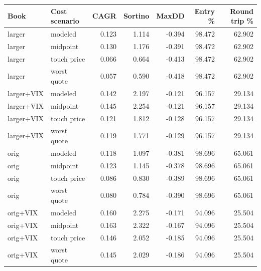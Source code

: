 \begin{tabular}{llrrrrr}
\toprule
Book & Cost scenario & CAGR & Sortino & MaxDD & Entry \% & Round trip \% \\
\midrule
larger & modeled & 0.123 & 1.114 & -0.394 & 98.472 & 62.902 \\
larger & midpoint & 0.130 & 1.176 & -0.391 & 98.472 & 62.902 \\
larger & touch price & 0.066 & 0.664 & -0.413 & 98.472 & 62.902 \\
larger & worst quote & 0.057 & 0.590 & -0.418 & 98.472 & 62.902 \\
\addlinespace
larger+VIX & modeled & 0.142 & 2.197 & -0.121 & 96.157 & 29.134 \\
larger+VIX & midpoint & 0.145 & 2.254 & -0.121 & 96.157 & 29.134 \\
larger+VIX & touch price & 0.121 & 1.812 & -0.128 & 96.157 & 29.134 \\
larger+VIX & worst quote & 0.119 & 1.771 & -0.129 & 96.157 & 29.134 \\
\addlinespace
orig & modeled & 0.118 & 1.097 & -0.381 & 98.696 & 65.061 \\
orig & midpoint & 0.123 & 1.145 & -0.378 & 98.696 & 65.061 \\
orig & touch price & 0.086 & 0.830 & -0.389 & 98.696 & 65.061 \\
orig & worst quote & 0.080 & 0.784 & -0.390 & 98.696 & 65.061 \\
\addlinespace
orig+VIX & modeled & 0.160 & 2.275 & -0.171 & 94.096 & 25.504 \\
orig+VIX & midpoint & 0.163 & 2.322 & -0.167 & 94.096 & 25.504 \\
orig+VIX & touch price & 0.146 & 2.052 & -0.185 & 94.096 & 25.504 \\
orig+VIX & worst quote & 0.145 & 2.029 & -0.186 & 94.096 & 25.504 \\
\bottomrule
\end{tabular}
